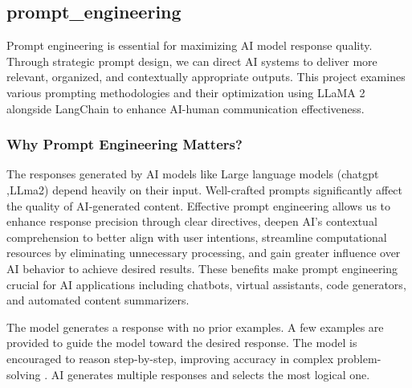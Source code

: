 \subsection{prompt_engineering}
Prompt engineering is essential for maximizing AI model response quality. Through strategic prompt 
design, we can direct AI systems to deliver more relevant, organized, and contextually appropriate 
outputs. This project examines various prompting methodologies and their optimization using LLaMA 
2 alongside LangChain to enhance AI-human communication effectiveness.

\subsubsection{Why Prompt Engineering Matters?}
The responses generated by AI models like Large language models (chatgpt ,LLma2) depend heavily on their input. Well-crafted 
prompts significantly affect the quality of AI-generated content. Effective prompt engineering allows 
us to enhance response precision through clear directives, deepen AI's contextual comprehension to 
better align with user intentions, streamline computational resources by eliminating unnecessary 
processing, and gain greater influence over AI behavior to achieve desired results. These benefits 
make prompt engineering crucial for AI applications including chatbots, virtual assistants, code 
generators, and automated content summarizers. 

The model generates a response with no prior examples.
A few examples are provided to guide the model toward the desired response.
The model is encouraged to reason step-by-step, improving accuracy in complex problem-solving \cite{wei2022chain}.
AI generates multiple responses and selects the most logical one.